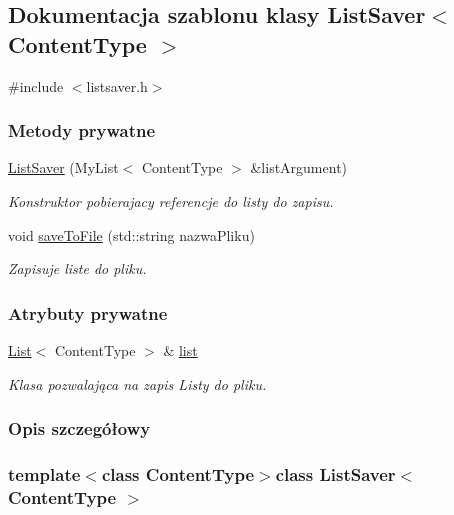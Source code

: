 \hypertarget{class_list_saver}{\subsection{Dokumentacja szablonu klasy List\-Saver$<$ Content\-Type $>$}
\label{class_list_saver}
}


{\ttfamily \#include $<$listsaver.\-h$>$}

\subsubsection*{Metody prywatne}
\begin{DoxyCompactItemize}
\item 
\hyperlink{class_list_saver_ac4ad5223df78883a0301c3835a0eae55}{List\-Saver} (My\-List$<$ Content\-Type $>$ \&list\-Argument)
\begin{DoxyCompactList}\small\item\em Konstruktor pobierajacy referencje do listy do zapisu. \end{DoxyCompactList}\item 
void \hyperlink{class_list_saver_afd2e2fed3c727a4f025e3ec3ab3d3831}{save\-To\-File} (std\-::string nazwa\-Pliku)
\begin{DoxyCompactList}\small\item\em Zapisuje liste do pliku. \end{DoxyCompactList}\end{DoxyCompactItemize}
\subsubsection*{Atrybuty prywatne}
\begin{DoxyCompactItemize}
\item 
\hyperlink{class_list}{List}$<$ Content\-Type $>$ \& \hyperlink{class_list_saver_a6af039caf1e8895cf77097a942bd870d}{list}
\begin{DoxyCompactList}\small\item\em Klasa pozwalająca na zapis Listy do pliku. \end{DoxyCompactList}\end{DoxyCompactItemize}


\subsubsection{Opis szczegółowy}
\subsubsection*{template$<$class Content\-Type$>$class List\-Saver$<$ Content\-Type $>$}



